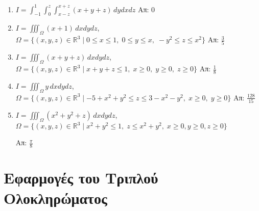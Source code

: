 \begin{enumerate}
      \item $ I=\int_{-1}^{1}\!\!\int_{0}^{z}\!\int_{x-z}^{x+z}(x+y+z)\,dydxdz $ 
        \hfill Απ: 0  
      \item $ I=\iiint_{\Omega}(x+1)\,dxdydz $, \quad $ \Omega = \{(x,y,z)\in 
          \mathbb{R}^{3} \mid 0 \leq x \leq 1,\; 0 \leq y \leq x,\; -y^{2} \leq z 
        \leq x^{2} \}$ 
        \hfill Απ: $ \frac{3}{5} $ 
      \item $ I=\iiint_{\Omega} (x+y+z)\,dxdydz $, \quad $ \Omega= \{(x,y,z)\in 
        \mathbb{R}^{3} \mid x+y+z \leq 1,\; x \geq 0,\; y \geq 0,\; z \geq 0 \}  $ 
        \hfill Απ: $ \frac{1}{8} $ 
      \item $ I=\iiint_{\Omega} y\,dxdydz $, \quad $ \Omega = \{ (x,y,z) \in 
          \mathbb{R}^{3} \mid -5 + x^{2}+y^{2} \leq z \leq 3 - x^{2}-y^{2}, \; x 
        \geq 0, \; y \geq 0\}$ 
        \hfill Απ: $ \frac{128}{15} $  
      \item $ I = \iiint_{\Omega} (x^{2}+y^{2}+z) \,dxdydz $, \quad $\Omega = \{ 
          (x,y,z) \in \mathbb{R}^{3} \mid x^{2}+y^{2} \leq 1,\; z \leq x^{2}+y^{2}, 
        \; x \geq 0, y \geq 0, z \geq 0\} $ 

        \hfill Απ: $ \frac{\pi}{8} $ 
    \end{enumerate}


    \section*{Εφαρμογές του Τριπλού Ολοκληρώματος}

